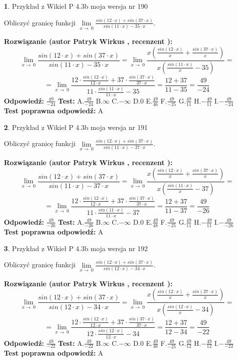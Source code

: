 \documentclass[12pt, a4paper]{article}
\theoremstyle{definition} %
\newtheorem{zad}{}
\newcommand{\zadStart}[1]{\begin{zad}#1\newline}
\newcommand{\zadStop}{\end{zad}}
\newcommand{\rozwStart}[2]{\noindent \textbf{Rozwiązanie (autor #1 , recenzent #2): }\newline}
\newcommand{\rozwStop}{\newline}
\newcommand{\odpStart}{\noindent \textbf{Odpowiedź:}\newline}
\newcommand{\odpStop}{\newline}
\newcommand{\testStart}{\noindent \textbf{Test:}\newline}
\newcommand{\testStop}{\newline}
\newcommand{\kluczStart}{\noindent \textbf{Test poprawna odpowiedź:}\newline}
\newcommand{\kluczStop}{\newline}
\begin{document}
\zadStart{Przykład z Wikieł P 4.3b moja wersja nr 190}


Obliczyć granicę funkcji $\lim\limits_{x\to\ 0}\frac{sin(12 \cdot x)+sin(37 \cdot x)}{sin(11 \cdot x)-35 \cdot x}$.
\zadStop
\rozwStart{Patryk Wirkus}{}
$$\lim\limits_{x\to\ 0}\frac{sin(12 \cdot x)+sin(37 \cdot x)}{sin(11 \cdot x)-35 \cdot x}=\lim\limits_{x\to\ 0}\frac{x(\frac{sin(12 \cdot x)}{x}+\frac{sin(37 \cdot x)}{x})}{x(\frac{sin(11 \cdot x)}{x}-35)}=$$
$$=\lim\limits_{x\to\ 0}\frac{12 \cdot \frac{sin(12 \cdot x)}{12 \cdot x}+37 \cdot \frac{sin(37 \cdot x)}{37 \cdot x}}{11 \cdot \frac{sin(11 \cdot x)}{11 \cdot x}-35}=\frac{12+37}{11-35} = \frac{49}{-24}$$
\rozwStop
\odpStart
$\frac{49}{-24}$
\odpStop
\testStart
A.$\frac{49}{-24}$
B.$\infty$
C.$-\infty$
D.$0$
E.$\frac{49}{46}$
F.$\frac{49}{-25}$
G.$\frac{49}{11}$
H.$-\frac{49}{11}$
I.$-\frac{49}{-24}$
\testStop
\kluczStart
A
\kluczStop



\zadStart{Przykład z Wikieł P 4.3b moja wersja nr 191}


Obliczyć granicę funkcji $\lim\limits_{x\to\ 0}\frac{sin(12 \cdot x)+sin(37 \cdot x)}{sin(11 \cdot x)-37 \cdot x}$.
\zadStop
\rozwStart{Patryk Wirkus}{}
$$\lim\limits_{x\to\ 0}\frac{sin(12 \cdot x)+sin(37 \cdot x)}{sin(11 \cdot x)-37 \cdot x}=\lim\limits_{x\to\ 0}\frac{x(\frac{sin(12 \cdot x)}{x}+\frac{sin(37 \cdot x)}{x})}{x(\frac{sin(11 \cdot x)}{x}-37)}=$$
$$=\lim\limits_{x\to\ 0}\frac{12 \cdot \frac{sin(12 \cdot x)}{12 \cdot x}+37 \cdot \frac{sin(37 \cdot x)}{37 \cdot x}}{11 \cdot \frac{sin(11 \cdot x)}{11 \cdot x}-37}=\frac{12+37}{11-37} = \frac{49}{-26}$$
\rozwStop
\odpStart
$\frac{49}{-26}$
\odpStop
\testStart
A.$\frac{49}{-26}$
B.$\infty$
C.$-\infty$
D.$0$
E.$\frac{49}{48}$
F.$\frac{49}{-25}$
G.$\frac{49}{11}$
H.$-\frac{49}{11}$
I.$-\frac{49}{-26}$
\testStop
\kluczStart
A
\kluczStop



\zadStart{Przykład z Wikieł P 4.3b moja wersja nr 192}


Obliczyć granicę funkcji $\lim\limits_{x\to\ 0}\frac{sin(12 \cdot x)+sin(37 \cdot x)}{sin(12 \cdot x)-34 \cdot x}$.
\zadStop
\rozwStart{Patryk Wirkus}{}
$$\lim\limits_{x\to\ 0}\frac{sin(12 \cdot x)+sin(37 \cdot x)}{sin(12 \cdot x)-34 \cdot x}=\lim\limits_{x\to\ 0}\frac{x(\frac{sin(12 \cdot x)}{x}+\frac{sin(37 \cdot x)}{x})}{x(\frac{sin(12 \cdot x)}{x}-34)}=$$
$$=\lim\limits_{x\to\ 0}\frac{12 \cdot \frac{sin(12 \cdot x)}{12 \cdot x}+37 \cdot \frac{sin(37 \cdot x)}{37 \cdot x}}{12 \cdot \frac{sin(12 \cdot x)}{12 \cdot x}-34}=\frac{12+37}{12-34} = \frac{49}{-22}$$
\rozwStop
\odpStart
$\frac{49}{-22}$
\odpStop
\testStart
A.$\frac{49}{-22}$
B.$\infty$
C.$-\infty$
D.$0$
E.$\frac{49}{46}$
F.$\frac{49}{-25}$
G.$\frac{49}{12}$
H.$-\frac{49}{12}$
I.$-\frac{49}{-22}$
\testStop
\kluczStart
A
\kluczStop
\end{document}
